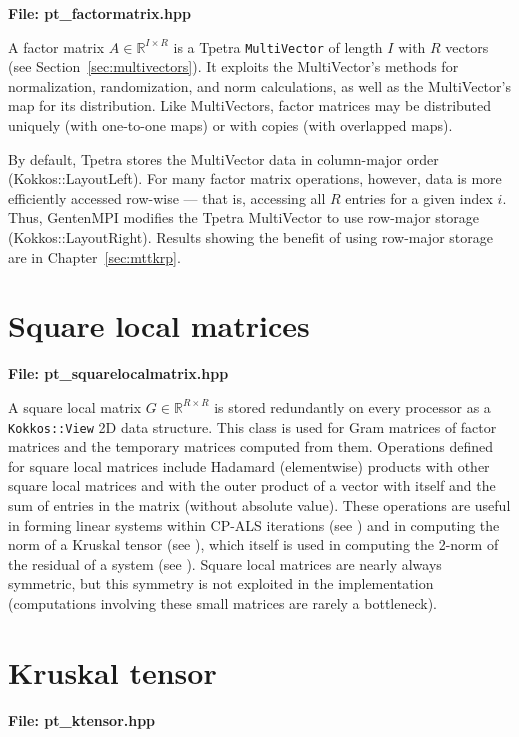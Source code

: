 {\bf File:  pt\_factormatrix.hpp}

A factor matrix $A \in \mathbb{R}^{I \times R}$ is a Tpetra {\tt MultiVector} 
of length $I$ with $R$ vectors (see Section~\ref{sec:multivectors}).  It 
exploits the MultiVector's methods for normalization, randomization,
and norm calculations, as well as the MultiVector's map for its distribution.
Like MultiVectors, factor matrices may be distributed uniquely (with 
one-to-one maps) or with copies (with overlapped maps).

By default, Tpetra stores the MultiVector data in column-major order
(Kokkos::LayoutLeft).  For many factor matrix operations, however, data is
more efficiently accessed row-wise --- that is, accessing 
all $R$ entries for a given index $i$.  Thus, GentenMPI modifies the 
Tpetra MultiVector to use row-major storage (Kokkos::LayoutRight).
Results showing the benefit of using row-major storage are in 
Chapter~\ref{sec:mttkrp}.

\section{Square local matrices} \label{sec:squarelocalmatrix}

{\bf File:  pt\_squarelocalmatrix.hpp}

A square local matrix $G\in \mathbb{R}^{R \times R}$ is stored redundantly on every processor as a \texttt{Kokkos::View} 2D data structure.
This class is used for Gram matrices of factor matrices and the temporary matrices computed from them.
Operations defined for square local matrices include Hadamard (elementwise) products with other square local matrices and with the outer product of a vector with itself and the sum of entries in the matrix (without absolute value).
These operations are useful in forming linear systems within CP-ALS iterations (see ) and in computing the norm of a Kruskal tensor (see ), which itself is used in computing the 2-norm of the residual of a system (see ).
Square local matrices are nearly always symmetric, but this symmetry is not exploited in the implementation (computations involving these small matrices are rarely a bottleneck).

\section{Kruskal tensor} \label{sec:ktensor}

{\bf File:  pt\_ktensor.hpp}

